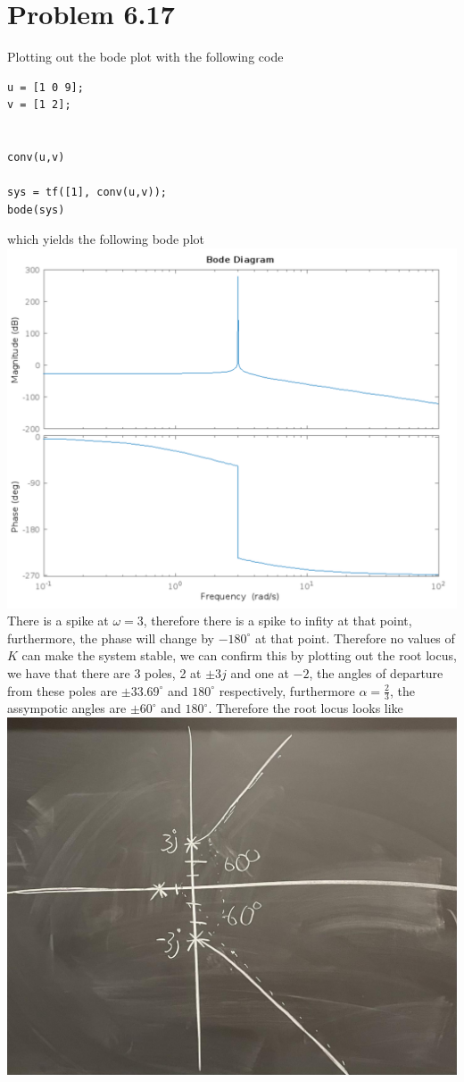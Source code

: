 \documentclass[12pt]{article}
\begin{document}
\section*{Problem 6.17}
Plotting out the bode plot with the following code
\begin{verbatim}
u = [1 0 9];
v = [1 2];


conv(u,v)

sys = tf([1], conv(u,v));
bode(sys)
\end{verbatim}
which yields the following bode plot\\
\includegraphics[scale=0.2]{Problem4Fig1.png}
There is a spike at $\omega=3$, therefore there is a spike to infity at that point, furthermore, the phase will change by $-180^{\circ}$ at that point. Therefore no values of $K$ can
make the system stable, we can confirm this by plotting out the root locus, we have that there are 3 poles, 2 at $\pm 3j$ and one at $-2$, the angles of departure from these poles are
$\pm33.69^{\circ}$ and $180^{\circ}$ respectively, furthermore $\alpha=\frac{2}{3}$, the assympotic angles are $\pm60^{\circ}$ and $180^{\circ}$.
 Therefore the root locus looks like\\
\includegraphics[scale=0.2]{Problem4Fig2.jpg}
\end{document}
